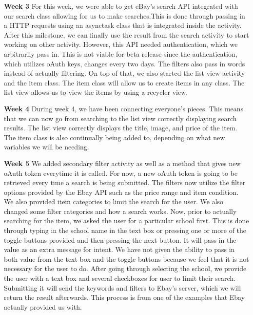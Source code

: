 \documentclass[journal,compsoc, 10pt, draftclsnofoot, onecolumn]{IEEEtran}
\begin{document}
\textbf{Week 3}\newline
For this week, we were able to get eBay's search API integrated with our 
search class allowing for us to make searches.This is done through passing in a HTTP requests using an asynctask class that is integrated inside the activity. After this milestone, we can finally use the result from the search activity to start working on other activity. However, this API needed authentication, which we arbitrarily pass in. This is not viable for beta release since the authentication, which utilizes oAuth keys, changes every two days. The filters also pass in words instead of actually filtering. On top of that, we also started 
the list view activity and the item class. The item class will allow us to create 
items in any class. The list view allows us to view the items by using a recycler 
view.\newline

\textbf{Week 4}\newline
During week 4, we have been connecting everyone's pieces. This means that we 
can now go from searching to the list view correctly displaying search results. 
The list view correctly displays the title, image, and price of the item. The 
item class is also continually being added to, depending on what new variables
we will be needing. \newline

\textbf{Week 5}\newline
 We added secondary filter activity as well as a method that gives new oAuth token everytime it is called. For now, a new oAuth token is going to be retrieved every time a search is being submitted. The filters now utilize the filter options provided by the Ebay API such as the price range and item condition. We also provided item categories to limit the search for the user. We also changed some filter categories and how a search works. Now, prior to actually searching for the item, we asked the user for a particular school first. This is done through typing in the school name in the text box or pressing one or more of the toggle buttons provided and then pressing the next button. It will pass in the value as an extra message for intent. We have not given the ability to pass in both value from the text box and the toggle buttons because we feel that it is not necessary for the user to do. After going through selecting the school, we provide the user with a text box and several checkboxes for user to limit their search. Submitting it will send the keywords and filters to Ebay’s server, which we will return the result afterwards. This process is from one of the examples that Ebay actually provided us with. 
\end{document}
